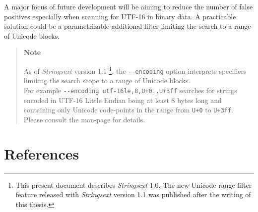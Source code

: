 A major focus of future development will be aiming to reduce the number
of false positives especially when scanning for UTF-16 in binary data. A
practicable solution could be a parametrizable additional filter
limiting the search to a range of Unicode blocks.

\begin{quote}
\textbf{Note}

As of \emph{Stringsext} version 1.1 \footnote{This present document
  describes \emph{Stringsext} 1.0. The new Unicode-range-filter feature
  released with \emph{Stringsext} version 1.1 was published after the
  writing of this thesis.}, the \texttt{-\/-encoding} option interprets
specifiers limiting the search scope to a range of Unicode blocks.\\
For example \texttt{-\/-encoding\ utf-16le,8,U+0..U+3ff} searches for
strings encoded in UTF-16 Little Endian being at least 8 bytes long and
containing only Unicode code-points in the range from \texttt{U+0} to
\texttt{U+3ff}. Please consult the man-page for details.
\end{quote}

\section{References}\label{_references}

